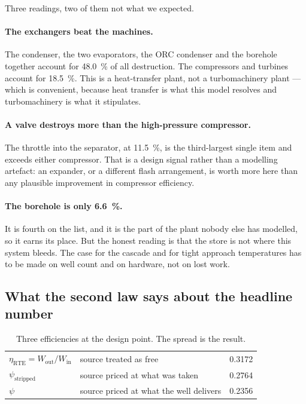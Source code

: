 Three readings, two of them not what we expected.

\paragraph{The exchangers beat the machines.} The condenser, the two
evaporators, the ORC condenser and the borehole together account for
\SI{48.0}{\percent} of all destruction. The compressors and turbines account for
\SI{18.5}{\percent}. This is a heat-transfer plant, not a turbomachinery plant
--- which is convenient, because heat transfer is what this model resolves and
turbomachinery is what it stipulates.

\paragraph{A valve destroys more than the high-pressure compressor.} The
throttle into the separator, at \SI{11.5}{\percent}, is the third-largest
single item and exceeds either compressor. That is a design signal rather than
a modelling artefact: an expander, or a different flash arrangement, is worth
more here than any plausible improvement in compressor efficiency.

\paragraph{The borehole is only \SI{6.6}{\percent}.} It is fourth on the list,
and it is the part of the plant nobody else has modelled, so it earns its
place. But the honest reading is that the store is not where this system
bleeds. The case for the cascade and for tight approach temperatures has to be
made on well count and on hardware, not on lost work.

\subsection{What the second law says about the headline number}
\label{sec:exergy:psi}

\begin{table}[htbp]
  \centering
  \caption{Three efficiencies at the design point. The spread is the result.}
  \label{tab:exergy:psi}
  \begin{tabular}{llr}
    \toprule
    $\eta_{\mathrm{RTE}} = W_{\mathrm{out}}/W_{\mathrm{in}}$
      & source treated as free & 0.3172 \\
    $\psi_{\mathrm{stripped}}$
      & source priced at what was taken & 0.2764 \\
    $\psi$
      & source priced at what the well delivers & 0.2356 \\
    \bottomrule
  \end{tabular}
\end{table}

